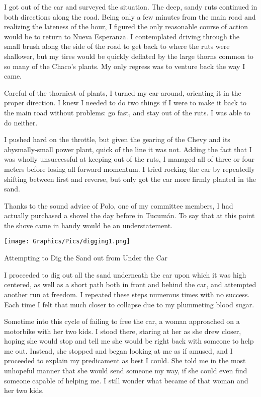 I got out of the car and surveyed the situation. The deep, sandy ruts continued in both directions along the road. Being only a few minutes from the main road and realizing the lateness of the hour, I figured the only reasonable course of action would be to return to Nueva Esperanza. I contemplated driving through the small brush along the side of the road to get back to where the ruts were shallower, but my tires would be quickly deflated by the large thorns common to so many of the Chaco’s plants. My only regress was to venture back the way I came.

Careful of the thorniest of plants, I turned my car around, orienting it in the proper direction. I knew I needed to do two things if I were to make it back to the main road without problems: go fast, and stay out of the ruts. I was able to do neither.

I pushed hard on the throttle, but given the gearing of the Chevy and its abysmally-small power plant, quick of the line it was not. Adding the fact that I was wholly unsuccessful at keeping out of the ruts, I managed all of three or four meters before losing all forward momentum. I tried rocking the car by repeatedly shifting between first and reverse, but only got the car more firmly planted in the sand.

Thanks to the sound advice of Polo, one of my committee members, I had actually purchased a shovel the day before in Tucumán. To say that at this point the shove came in handy would be an understatement.

\begin{ssfigure}
  \centering
  \texttt{[image: Graphics/Pics/digging1.png]}
  \caption{Attempting to Dig the Sand out from Under the Car}
  \label{pic:digging1}
\end{ssfigure}

I proceeded to dig out all the sand underneath the car upon which it was high centered, as well as a short path both in front and behind the car, and attempted another run at freedom. I repeated these steps numerous times with no success. Each time I felt that much closer to collapse due to my plummeting blood sugar.

Sometime into this cycle of failing to free the car, a woman approached on a motorbike with her two kids. I stood there, staring at her as she drew closer, hoping she would stop and tell me she would be right back with someone to help me out. Instead, she stopped and began looking at me as if amused, and I proceeded to explain my predicament as best I could. She told me in the most unhopeful manner that she would send someone my way, if she could even find someone capable of helping me. I still wonder what became of that woman and her two kids.

